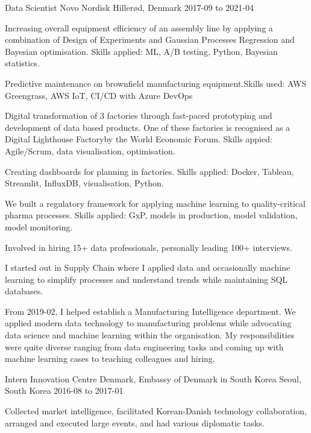 \begin{cventries}
\cventry
{Data Scientist} %
{Novo Nordisk} %
{Hillerød, Denmark} %
{2017-09 to 2021-04} %
{ %
\begin{cvitems}
\item {Increasing overall equipment efficiency of an assembly line by applying a combination of Design of Experiments and Gaussian Processes Regression and Bayesian optimisation. Skills applied: ML, A/B testing, Python, Bayesian statistics.}
\item {Predictive maintenance on brownfield manufacturing equipment.Skills used: AWS Greengrass, AWS IoT, CI/CD with Azure DevOps}
\item {Digital transformation of 3 factories through fast-paced prototyping and development of data based products. One of these factories is recognised as a Digital Lighthouse Factoryby the World Economic Forum. Skills appied: Agile/Scrum, data visualisation, optimisation.}
\item {Creating dashboards for planning in factories. Skills applied: Docker, Tableau, Streamlit, InfluxDB, visualisation, Python.}
\item {We built a regulatory framework for applying machine learning to quality-critical pharma processes. Skills applied: GxP, models in production, model validation, model monitoring.}
\item {Involved in hiring 15+ data professionals, personally leading 100+ interviews.}
\item {I started out in Supply Chain where I applied data and occasionally machine learning to simplify processes and understand trends while maintaining SQL databases.}
\item {From 2019-02, I helped establish a Manufacturing Intelligence department. We applied modern data technology to manufacturing problems while advocating data science and machine learning within the organisation. My responsibilities were quite diverse ranging from data engineering tasks and coming up with machine learning cases to teaching colleagues and hiring.}
\end{cvitems}
}

\cventry
{Intern}
{Innovation Centre Denmark, Embassy of Denmark in South Korea}
{Seoul, South Korea}
{2016-08 to 2017-01}
{
\begin{cvitems}
\item {Collected market intelligence, facilitated Korean-Danish technology collaboration, arranged and executed large events, and had various diplomatic tasks.}
\end{cvitems}
}

\end{cventries}